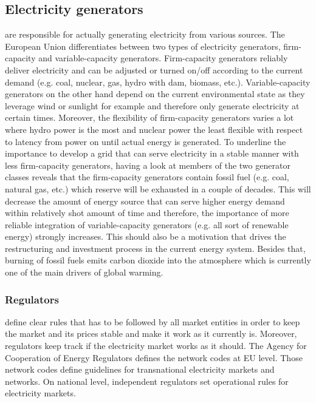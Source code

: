 \documentclass[runningheads]{llncs}
\begin{document}
\subsection{Electricity generators} are responsible for actually generating electricity from various sources. The European Union differentiates between two types of electricity generators, firm-capacity and variable-capacity generators. Firm-capacity generators reliably deliver electricity and can be adjusted or turned on/off according to the current demand (e.g. coal, nuclear, gas, hydro with dam, biomass, etc.). Variable-capacity generators on the other hand depend on the current environmental state as they leverage wind or sunlight for example and therefore only generate electricity at certain times.  Moreover, the flexibility of firm-capacity generators varies a lot where hydro power is the most and nuclear power the least flexible with respect to latency from power on until actual energy is generated.
To underline the importance to develop a grid that can serve electricity in a stable manner with less firm-capacity generators, having a look at members of the two generator classes reveals that the firm-capacity generators contain fossil fuel (e.g. coal, natural gas, etc.) which reserve will be exhausted in a couple of decades. This will decrease the amount of energy source that can serve higher energy demand within relatively shot amount of time and therefore, the importance of more reliable integration of variable-capacity generators (e.g. all sort of renewable energy) strongly increases. This should also be a motivation that drives the restructuring and investment process in the current energy system. Besides that, burning of fossil fuels emits carbon dioxide into the atmosphere which is currently one of the main drivers of global warming. \cite{eu_energy_market}

\subsubsection{Regulators} define clear rules that has to be followed by all market entities in order to keep the market and its prices stable and make it work as it currently is. Moreover, regulators keep track if the electricity market works as it should. The Agency for Cooperation of Energy Regulators defines the network codes at EU level. Those network codes define guidelines for transnational electricity markets and networks. On national level, independent regulators set operational rules for electricity markets.
\end{document}
